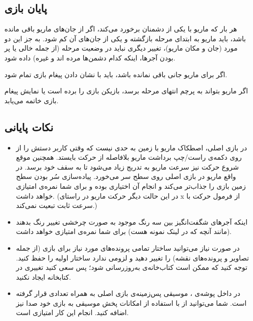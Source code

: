 \documentclass{utap}
\begin{document}
	\subsection{پایان بازی}
هر بار که ماریو با یکی از دشمنان برخورد می‌کند، اگر از جان‌های ماریو باقی مانده باشد، باید ماریو به ابتدای مرحله بازگشته و یکی از جان‌های آن کم شود. به جز این دو مورد (جان و مکان ماریو)، تغییر دیگری نباید در وضعیت مرحله (از جمله خالی یا پر بودن آجر‌ها، اینکه کدام دشمن‌ها مرده اند و غیره) داده شود.

اگر برای ماریو جانی باقی نمانده باشد، باید با نشان دادن پیغام  بازی تمام شود.

اگر ماریو بتواند به پرچم انتهای مرحله برسد، بازیکن بازی را برده است یا نمایش پیغام  بازی خاتمه می‌یابد.
	\subsection{نکات پایانی}
	\begin{itemize}
		\item
در بازی اصلی، اصطکاک ماریو با زمین به حدی نیست که وقتی کاربر دستش را از روی دکمه‌ی راست/چپ برداشت ماریو بلافاصله از حرکت بایستد. همچنین موقع شروع حرکت نیز سرعت ماریو به تدریج زیاد می‌شود تا به سقف خود برسد. در واقع ماریو در بازی اصلی روی سطح سر می‌خورد. پیاده‌سازی سُر بودن سطح زمین بازی را جذاب‌تر می‌کند و انجام آن اختیاری بوده و برای شما نمره‌ی امتیازی خواهد داشت. (در این حالت دیگر حرکت ماریو در راستای x از فرمول حرکت با سرعت ثابت تبعیت نمی‌کند.)
		\item
اینکه آجر‌های شگفت‌انگیز بین سه رنگ موجود به صورت چرخشی تغییر رنگ بدهند (مانند آنچه که در لینک نمونه هست) برای شما نمره‌ی امتیازی خواهد داشت. 
		\item
در صورت نیاز می‌توانید ساختار تمامی پرونده‌های مورد نیاز برای بازی (از جمله تصاویر و پرونده‌های نقشه) را تغییر دهید و لزومی ندارد ساختار اولیه را حفظ کنید.
توجه کنید که ممکن است کتاب‌خانه‌ی  به‌روزرسانی شود؛ پس سعی کنید تغییری در کتابخانه ایجاد نکنید.
		\item
در داخل پوشه‌ی ، موسیقی پس‌زمینه‌ی بازی اصلی به همراه تعدادی  قرار گرفته است. شما می‌توانید از با استفاده از امکانات پخش موسیقی  به بازی خود صدا نیز اضافه کنید. انجام این کار امتیازی است.
	\end{itemize}
	
\end{document}
